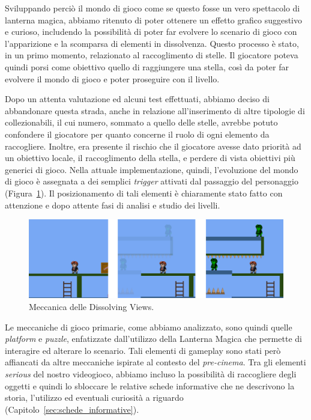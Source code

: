 Sviluppando perciò il mondo di gioco come se questo fosse un vero spettacolo di lanterna magica, abbiamo ritenuto di poter ottenere un effetto grafico suggestivo e curioso, includendo la possibilità di poter far evolvere lo scenario di gioco con l’apparizione e la scomparsa di elementi in dissolvenza.
Questo processo è stato, in un primo momento, relazionato al raccoglimento di stelle. Il giocatore poteva quindi porsi come obiettivo quello di raggiungere una stella, così da poter far evolvere il mondo di gioco e poter proseguire con il livello.

Dopo un attenta valutazione ed alcuni test effettuati, abbiamo deciso di abbandonare questa strada, anche in relazione all’inserimento di altre tipologie di collezionabili, il cui numero, sommato a quello delle stelle, avrebbe potuto confondere il giocatore per quanto concerne il ruolo di ogni elemento da raccogliere. Inoltre, era presente il rischio che il giocatore avesse dato priorità ad un obiettivo locale, il raccoglimento della stella, e perdere di vista obiettivi più generici di gioco.
Nella attuale implementazione, quindi, l’evoluzione del mondo di gioco è assegnata a dei semplici \textit{trigger} attivati dal passaggio del personaggio (Figura~\ref{fig:meccaniche_precinema_dissolving}). Il posizionamento di tali elementi è chiaramente stato fatto con attenzione e dopo attente fasi di analisi e studio dei livelli.

\begin{figure}%
	\centering
	\includegraphics[width= \columnwidth]{images/gameDesign/22.jpg}
	\caption{Meccanica delle Dissolving Views.}
	\label{fig:meccaniche_precinema_dissolving}
\end{figure} 

Le meccaniche di gioco primarie, come abbiamo analizzato, sono quindi quelle \textit{platform} e \textit{puzzle}, enfatizzate dall’utilizzo della Lanterna Magica che permette di interagire ed alterare lo scenario.
Tali elementi di gameplay sono stati però affiancati da altre meccaniche ispirate al contesto del \textit{pre-cinema}.
Tra gli elementi \textit{serious} del nostro videogioco, abbiamo incluso la possibilità di raccogliere degli oggetti e quindi lo sbloccare le relative schede informative che ne descrivono la storia, l’utilizzo ed eventuali curiosità a riguardo (Capitolo~\ref{sec:schede_informative}).

